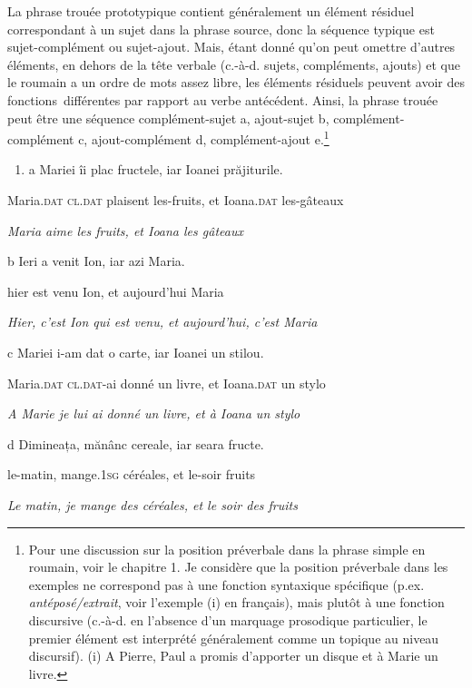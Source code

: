 La phrase trouée prototypique contient généralement un élément résiduel correspondant à un sujet dans la phrase source, donc la séquence typique est sujet-complément ou sujet-ajout. Mais, étant donné qu'on peut omettre d'autres éléments, en dehors de la tête verbale (c.-à-d. sujets, compléments, ajouts) et que le roumain a un ordre de mots assez libre, les éléments résiduels peuvent avoir des fonctions~différentes par rapport au verbe antécédent. Ainsi, la phrase trouée peut être une séquence complément-sujet a, ajout-sujet b, complément-complément c, ajout-complément d, complément-ajout e.\footnote{Pour une discussion sur la position préverbale dans la phrase simple en roumain, voir le chapitre 1. Je considère que la position préverbale dans les exemples  ne correspond pas à une fonction syntaxique spécifique (p.ex. \textit{antéposé/extrait}, voir l'exemple (i) en français), mais plutôt à une fonction discursive (c.-à-d. en l'absence d'un marquage prosodique particulier, le premier élément est interprété généralement comme un topique au niveau discursif). 
(i)  A Pierre, Paul a promis d'apporter un disque et à Marie un livre.} 


\begin{enumerate}
\item \label{bkm:Ref289342410}a  Mariei îi plac fructele, iar Ioanei prăjiturile.


\end{enumerate}
Maria.\textsc{dat cl.dat} plaisent les-fruits, et Ioana.\textsc{dat} les-gâteaux

{\itshape
Maria aime les fruits, et Ioana les gâteaux}

  b  Ieri a venit Ion, iar azi Maria.

    hier est venu Ion, et aujourd'hui Maria

{\itshape
Hier, c'est Ion qui est venu, et aujourd'hui, c'est Maria  } 

  c  Mariei i-am dat o carte, iar Ioanei un stilou.

    Maria.\textsc{dat cl.dat}-ai donné un livre, et Ioana.\textsc{dat} un stylo

    \textit{A Marie je lui ai donné un livre, et à Ioana un stylo}

  d  Dimineața, mănânc cereale, iar seara fructe.

    le-matin, mange.\textsc{1sg} céréales, et le-soir fruits

{\itshape
Le matin, je mange des céréales, et le soir des fruits  } 

